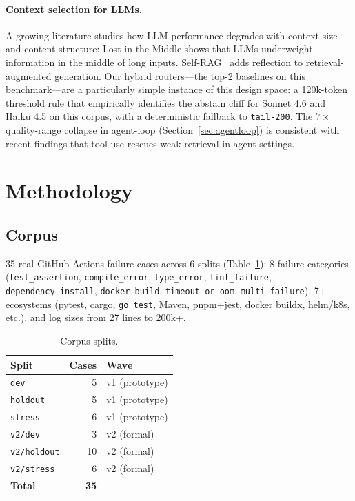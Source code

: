 \documentclass{article}
\begin{document}
\paragraph{Context selection for LLMs.}
A growing literature studies how LLM performance degrades with
context size and content structure: Lost-in-the-Middle
\cite{liu2024lostinthemiddle} shows that LLMs underweight
information in the middle of long inputs. Self-RAG~\cite{asai2024selfrag}
adds reflection to retrieval-augmented generation. Our hybrid
routers---the top-2 baselines on this benchmark---are a particularly
simple instance of this design space: a 120k-token threshold rule
that empirically identifies the abstain cliff for Sonnet 4.6 and
Haiku 4.5 on this corpus, with a deterministic fallback to
\texttt{tail-200}. The $7\times$ quality-range collapse in
agent-loop (Section~\ref{sec:agentloop}) is consistent with recent
findings that tool-use rescues weak retrieval in agent settings.

\section{Methodology}

\subsection{Corpus}

35 real GitHub Actions failure cases across 6 splits (Table~\ref{tab:corpus}):
8 failure categories
(\texttt{test\_assertion}, \texttt{compile\_error}, \texttt{type\_error},
\texttt{lint\_failure}, \texttt{dependency\_install},
\texttt{docker\_build}, \texttt{timeout\_or\_oom},
\texttt{multi\_failure}), 7+ ecosystems (pytest, cargo,
\texttt{go~test}, Maven, pnpm+jest, docker buildx, helm/k8s, etc.),
and log sizes from 27 lines to 200k+.

\begin{table}[h]
\centering
\caption{Corpus splits.}
\label{tab:corpus}
\begin{tabular}{lrl}
\toprule
\textbf{Split} & \textbf{Cases} & \textbf{Wave} \\
\midrule
\texttt{dev}        & 5  & v1 (prototype) \\
\texttt{holdout}    & 5  & v1 (prototype) \\
\texttt{stress}     & 6  & v1 (prototype) \\
\texttt{v2/dev}     & 3  & v2 (formal) \\
\texttt{v2/holdout} & 10 & v2 (formal) \\
\texttt{v2/stress}  & 6  & v2 (formal) \\
\midrule
\textbf{Total}      & \textbf{35} & \\
\bottomrule
\end{tabular}
\end{table}
\end{document}
